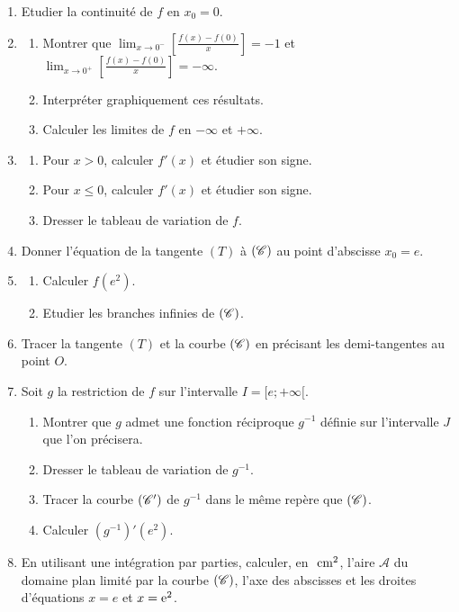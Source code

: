       \begin{enumerate}
            \item Etudier la continuit\'e de $f$ en $x_0 = 0$.
            \item \begin{enumerate}
                        \item Montrer que 
                              $\displaystyle{\lim_{x\rightarrow 0^-} \left[ \frac{f(x)-f(0)}{x} \right] = -1}$ et 
                              $\displaystyle{\lim_{x\rightarrow 0^+} \left[ \frac{f(x)-f(0)}{x} \right] = -\infty}$.
                        \item Interpr\'eter graphiquement ces r\'esultats.
                        \item Calculer les limites de $f$ en $-\infty$ et $+\infty$.
                  \end{enumerate}
            \item \begin{enumerate}
                        \item Pour $x>0$, calculer $f'(x)$ et \'etudier son signe.
                        \item Pour $x\leq 0$, calculer $f'(x)$ et \'etudier son signe.
                        \item Dresser le tableau de variation de $f$.
                  \end{enumerate}
            \item Donner l'\'equation de la tangente $(T)$ \`a $(\mathscr{C})$ au point d'abscisse $x_0 = e$.
            \item \begin{enumerate}
                        \item Calculer $f(e^2)$.
                        \item Etudier les branches infinies de $(\mathscr{C})$.
                  \end{enumerate}
            \item Tracer la tangente $(T)$ et la courbe $(\mathscr{C})$ en pr\'ecisant les demi-tangentes au point $O$.
            \item Soit $g$ la restriction de $f$ sur l'intervalle $I = [ e ; +\infty [$.
                  \begin{enumerate}
                        \item Montrer que $g$ admet une fonction r\'eciproque $g^{-1}$ d\'efinie sur l'intervalle $J$
                              que l'on pr\'ecisera.
                        \item Dresser le tableau de variation de $g^{-1}$.
                        \item Tracer la courbe $(\mathscr{C}')$ de $g^{-1}$ dans le m\^eme rep\`ere que $(\mathscr{C})$.
                        \item Calculer $(g^{-1})' (e^2)$.
                  \end{enumerate}
            \item En utilisant une int\'egration par parties, calculer, en $~\mathrm{cm}^2$, l'aire $\mathcal{A}$ du domaine plan
	                  limit\'e par la courbe $(\mathscr{C})$, l'axe des abscisses et les droites d'\'equations $x=e$ et $x=\mathrm{e}^{2}$.
                  

\end{enumerate}
